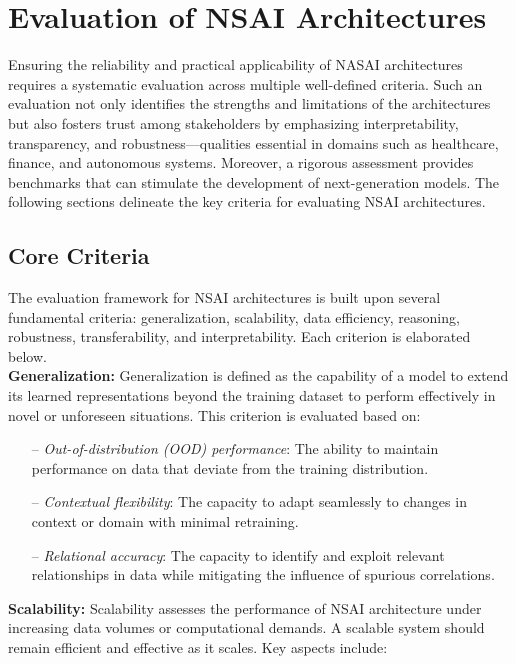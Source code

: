 \documentclass[12pt]{article}
\begin{document}
\section{Evaluation of NSAI Architectures}

Ensuring the reliability and practical applicability of NASAI architectures requires a systematic evaluation across multiple well-defined criteria. Such an evaluation not only identifies the strengths and limitations of the architectures but also fosters trust among stakeholders by emphasizing interpretability, transparency, and robustness—qualities essential in domains such as healthcare, finance, and autonomous systems. Moreover, a rigorous assessment provides benchmarks that can stimulate the development of next-generation models. The following sections delineate the key criteria for evaluating NSAI architectures. 

\subsection{Core Criteria}
The evaluation framework for NSAI architectures is built upon several fundamental criteria: generalization, scalability, data efficiency, reasoning, robustness, transferability, and interpretability. Each criterion is elaborated below.\\

\noindent \textbf{Generalization:}
Generalization is defined as the capability of a model to extend its learned representations beyond the training dataset to perform effectively in novel or unforeseen situations. This criterion is evaluated based on:

\begin{itemize}
    \item[--] \textit{Out-of-distribution (OOD) performance}: The ability to maintain performance on data that deviate from the training distribution.
    \item[--] \textit{Contextual flexibility}: The capacity to adapt seamlessly to changes in context or domain with minimal retraining.
    \item[--] \textit{Relational accuracy}: The capacity to identify and exploit relevant relationships in  data while mitigating the influence of spurious correlations.
\end{itemize}

\noindent \textbf{Scalability:}
Scalability assesses the performance of NSAI architecture under
increasing data volumes or computational demands. A scalable system should remain efficient and effective as it scales. Key aspects include:
\end{document}
